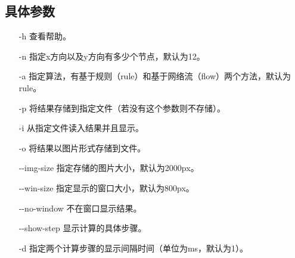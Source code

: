 \subsection{具体参数}
	\begin{itemize}
	\item[-h] 查看帮助。
	\item[-n] 指定x方向以及y方向有多少个节点，默认为12。
	\item[-a] 指定算法，有基于规则（rule）和基于网络流（flow）两个方法，默认为 rule。
	\item[-p] 将结果存储到指定文件（若没有这个参数则不存储）。
	\item[-i] 从指定文件读入结果并且显示。
	\item[-o] 将结果以图片形式存储到文件。
	\item[-{}-img-size] 指定存储的图片大小，默认为2000px。
	\item[-{}-win-size] 指定显示的窗口大小，默认为800px。
	\item[-{}-no-window] 不在窗口显示结果。
	\item[-{}-show-step] 显示计算的具体步骤。
	\item[-d] 指定两个计算步骤的显示间隔时间（单位为ms，默认为1）。
	\end{itemize}

